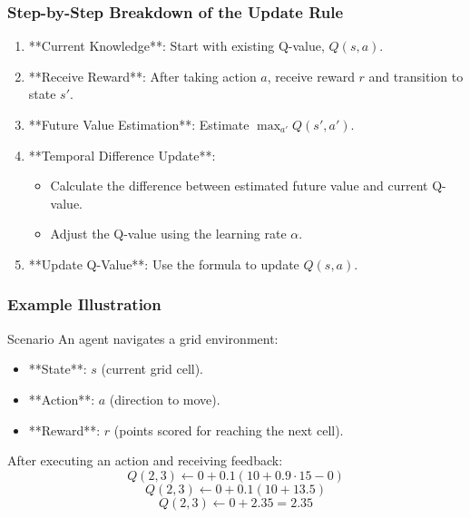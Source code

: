 \documentclass[aspectratio=169]{beamer}
\begin{document}
\begin{frame}[fragile]
    \frametitle{Step-by-Step Breakdown of the Update Rule}
    \begin{enumerate}
        \item **Current Knowledge**: Start with existing Q-value, \( Q(s, a) \).
        \item **Receive Reward**: After taking action \( a \), receive reward \( r \) and transition to state \( s' \).
        \item **Future Value Estimation**: Estimate \( \max_{a'} Q(s', a') \).
        \item **Temporal Difference Update**: 
            \begin{itemize}
                \item Calculate the difference between estimated future value and current Q-value.
                \item Adjust the Q-value using the learning rate \( \alpha \).
            \end{itemize}
        \item **Update Q-Value**: Use the formula to update \( Q(s, a) \).
    \end{enumerate}
\end{frame}

\begin{frame}[fragile]
    \frametitle{Example Illustration}
    \begin{block}{Scenario}
        An agent navigates a grid environment:
        \begin{itemize}
            \item **State**: \( s \) (current grid cell).
            \item **Action**: \( a \) (direction to move).
            \item **Reward**: \( r \) (points scored for reaching the next cell).
        \end{itemize}
    \end{block}
    
    After executing an action and receiving feedback:
    \begin{equation}
        Q(2, 3) \leftarrow 0 + 0.1 \left( 10 + 0.9 \cdot 15 - 0 \right) 
    \end{equation}
    \begin{equation}
        Q(2, 3) \leftarrow 0 + 0.1 \left( 10 + 13.5 \right) 
    \end{equation}
    \begin{equation}
        Q(2, 3) \leftarrow 0 + 2.35 = 2.35 
    \end{equation}
\end{frame}
\end{document}
